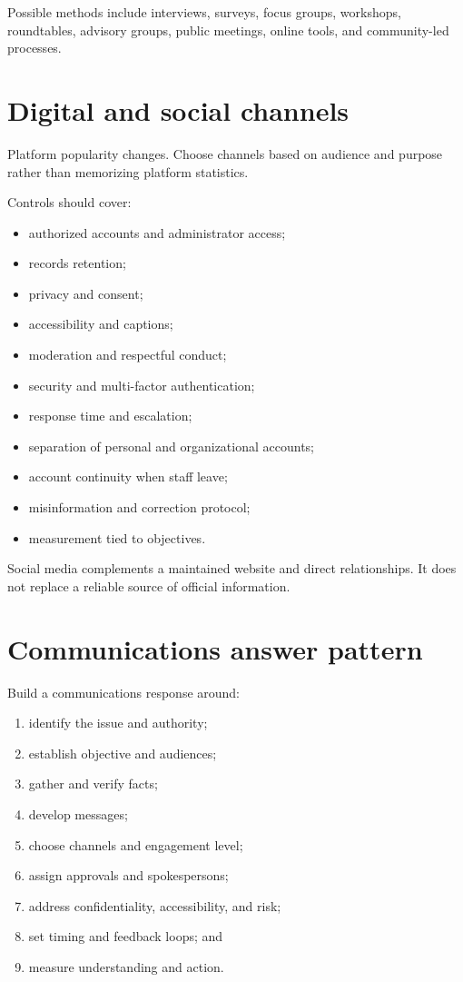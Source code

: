 \documentclass[11pt,letterpaper,oneside,openany]{book}
\begin{document}
Possible methods include interviews, surveys, focus groups, workshops, roundtables, advisory groups, public meetings, online tools, and community-led processes.


\section[Digital and social channels]{Digital and social channels}
Platform popularity changes. Choose channels based on audience and purpose rather than memorizing platform statistics.


Controls should cover:


\begin{itemize}
\item authorized accounts and administrator access;
\item records retention;
\item privacy and consent;
\item accessibility and captions;
\item moderation and respectful conduct;
\item security and multi-factor authentication;
\item response time and escalation;
\item separation of personal and organizational accounts;
\item account continuity when staff leave;
\item misinformation and correction protocol;
\item measurement tied to objectives.
\end{itemize}


Social media complements a maintained website and direct relationships. It does not replace a reliable source of official information.


\section[Communications answer pattern]{Communications answer pattern}
Build a communications response around:


\begin{enumerate}
\item identify the issue and authority;
\item establish objective and audiences;
\item gather and verify facts;
\item develop messages;
\item choose channels and engagement level;
\item assign approvals and spokespersons;
\item address confidentiality, accessibility, and risk;
\item set timing and feedback loops; and
\item measure understanding and action.
\end{enumerate}
\end{document}
